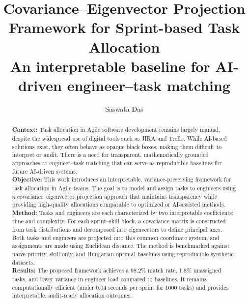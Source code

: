 \documentclass[final,1p,times]{elsarticle}
\begin{document}
\begin{frontmatter}

\title{Covariance--Eigenvector Projection Framework for Sprint-based Task Allocation\\
\large An interpretable baseline for AI-driven engineer--task matching}

\author[1]{Saswata Das}




\begin{abstract}

\textbf{Context:} Task allocation in Agile software development remains largely manual, despite the widespread use of digital tools such as JIRA and Trello. While AI-based solutions exist, they often behave as opaque black boxes, making them difficult to interpret or audit. There is a need for transparent, mathematically grounded approaches to engineer–task matching that can serve as reproducible baselines for future AI-driven systems. \\[3pt]

\textbf{Objective:} This work introduces an interpretable, variance-preserving framework for task allocation in Agile teams. The goal is to model and assign tasks to engineers using a covariance–eigenvector projection approach that maintains transparency while providing high-quality allocations comparable to optimized or AI-assisted methods. \\[3pt]

\textbf{Method:} Tasks and engineers are each characterized by two interpretable coefficients: time and complexity. For each sprint–skill block, a covariance matrix is constructed from task distributions and decomposed into eigenvectors to define principal axes. Both tasks and engineers are projected into this common coordinate system, and assignments are made using Euclidean distance. The method is benchmarked against naive-priority, skill-only, and Hungarian-optimal baselines using reproducible synthetic datasets. \\[3pt]

\textbf{Results:} The proposed framework achieves a 98.2\% match rate, 1.8\% unassigned tasks, and lower variance in engineer load compared to baselines. It remains computationally efficient (under 0.04 seconds per sprint for 1000 tasks) and provides interpretable, audit-ready allocation outcomes. \\[3pt]


\end{abstract}
\end{frontmatter}
\end{document}
